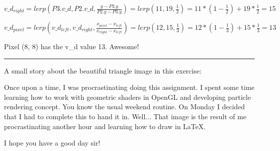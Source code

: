 $
    v\_d_{right}
=
    lerp\left(P3.v\_d, P2.v\_d, \frac{y - P3.y}{P2.y - P3.y}\right)
=
    lerp(11, 19, \frac{1}{2})
=
    11 * \left(1 - \frac{1}{2}\right) + 19 * \frac{1}{2}
=
    15
$

$
    v\_d_{pixel}
=
    lerp\left(v\_d_{left}, v\_d_{right}, \frac{x_{pixel} - x_{left}}{x_{right} - x_{left}}\right)
=
    lerp\left(12, 15, \frac{1}{3}\right)
=
    12 * \left(1 - \frac{1}{3}\right) + 15 * \frac{1}{3}
=
    13
$

Pixel (8, 8) has the v\_d value 13. Awesome!

\rule{\textwidth}{0.25mm}
A small story about the beautiful triangle image in this exercise:

Once upon a time, I was procrastinating doing this assignment. I spent some time learning how to work with geometric shaders in OpenGL and developing particle rendering concept. You know the usual weekend routine. On Monday I decided that I had to complete this to hand it in. Well... That image is the result of me procrastinating another hour and learning how to draw in \LaTeX.

I hope you have a good day sir!